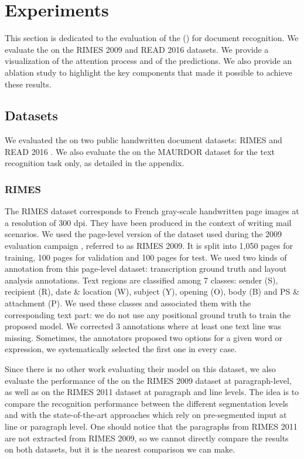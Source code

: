 \section{Experiments}
\label{section-experiments}
This section is dedicated to the evaluation of the \modelname{} (\modelacc{}) for document recognition. We evaluate the \modelacc{} on the RIMES 2009 and READ 2016 datasets. We provide a visualization of the attention process and of the predictions. We also provide an ablation study to highlight the key components that made it possible to achieve these results.

\subsection{Datasets}
We evaluated the \modelacc{} on two public handwritten document datasets: RIMES \cite{RIMES_page,RIMES} and READ 2016 \cite{READ2016}. We also evaluate the \modelacc{} on the MAURDOR dataset \cite{MAURDOR} for the text recognition task only, as detailed in the appendix.

\subsubsection{RIMES}
The RIMES dataset corresponds to French gray-scale handwritten page images at a resolution of 300 dpi. They have been produced in the context of writing mail scenarios. We used the page-level version of the dataset used during the 2009 evaluation campaign \cite{RIMES_page}, referred to as RIMES 2009. It is split into 1,050 pages for training, 100 pages for validation and 100 pages for test. We used two kinds of annotation from this page-level dataset: transcription ground truth and layout analysis annotations. Text regions are classified among 7 classes: sender (S), recipient (R), date \& location (W), subject (Y), opening (O), body (B) and PS \& attachment (P). We used these classes and associated them with the corresponding text part: we do not use any positional ground truth to train the proposed model. We corrected 3 annotations where at least one text line was missing. Sometimes, the annotators proposed two options for a given word or expression, we systematically selected the first one in every case. 

Since there is no other work evaluating their model on this dataset, we also evaluate the performance of the \modelacc{} on the RIMES 2009 dataset at paragraph-level, as well as on the RIMES 2011 dataset \cite{RIMES} at paragraph and line levels. The idea is to compare the recognition performance between the different segmentation levels and with the state-of-the-art approaches which rely on pre-segmented input at line or paragraph level. One should notice that the paragraphs from RIMES 2011 are not extracted from RIMES 2009, so we cannot directly compare the results on both datasets, but it is the nearest comparison we can make.

